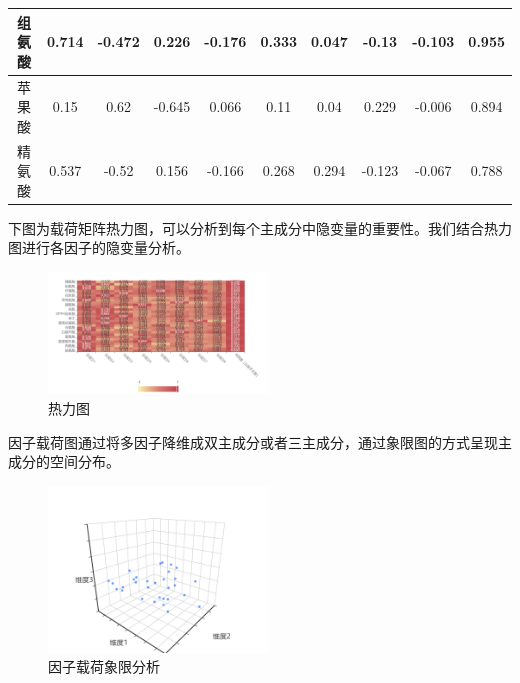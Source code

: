 \documentclass[UTF8]{ctexart}
\begin{document}
\begin{table}[!ht]
{{\begin{tabular}{|c|c|c|c|c|c|c|c|c|c|}
				组氨酸         & 0.714   & -0.472  & 0.226   & -0.176  & 0.333   & 0.047   & -0.13   & -0.103  & 0.955                \\ \hline
				苹果酸         & 0.15    & 0.62    & -0.645  & 0.066   & 0.11    & 0.04    & 0.229   & -0.006  & 0.894                \\ \hline
				精氨酸         & 0.537   & -0.52   & 0.156   & -0.166  & 0.268   & 0.294   & -0.123  & -0.067  & 0.788                \\ \hline
			\end{tabular}}}
\end{table}


下图为载荷矩阵热力图，可以分析到每个主成分中隐变量的重要性。我们结合热力图进行各因子的隐变量分析。

\begin{figure}[H]\centering

	\includegraphics[width=0.52\textwidth,height=0.52\textwidth]{img/4/heatmaps.png} %

	\caption{热力图} %
	\label{fig:figure 5} %
\end{figure}

因子载荷图通过将多因子降维成双主成分或者三主成分，通过象限图的方式呈现主成分的空间分布。

\begin{figure}[H]\centering

	\includegraphics[width=0.52\textwidth,height=0.45\textwidth]{img/4/3d_analysise.png} %

	\caption{因子载荷象限分析} %
	\label{fig:figure 5} %
\end{figure}
\end{document}
